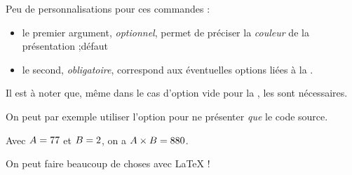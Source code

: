 \begin{cautionblock}
Peu de personnalisations pour ces commandes :

\begin{itemize}
	\item le premier argument, \textit{optionnel}, permet de préciser la \textit{couleur} de la présentation ;\hfill{}défaut 
	\item le second, \textit{obligatoire}, correspond aux éventuelles options liées à la .
\end{itemize}
\vspace*{-\baselineskip}\leavevmode
\end{cautionblock}

\begin{noteblock}
Il est à noter que, même dans le cas d'option vide pour la , les \ctex{\{\}} sont nécessaires.

\smallskip

On peut par exemple utiliser l'option  pour ne présenter \textit{que} le code source.
\end{noteblock}

\begin{PresCodePL}{}
\begin{PresentationCode}{}
\xdef\ValAleaA{\fpeval{randint(1,100)}}
\xdef\ValAleaB{\fpeval{randint(1,100)}}

Avec $A=\ValAleaA$ et $B=\ValAleaB$, on a $A\times B=\inteval{\ValAleaA * \ValAleaB}$.
\end{PresentationCode}

\begin{PresentationCode}[blue]{}
On peut faire beaucoup de choses avec \LaTeX{} !
\end{PresentationCode}
\end{PresCodePL}
